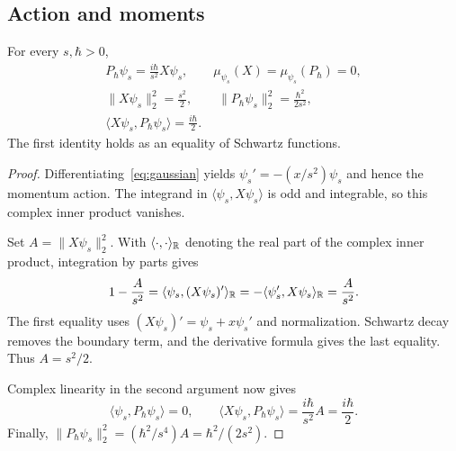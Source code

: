 \subsection{Action and moments}
\begin{theorem}\label{thm:moments}
For every $s,\hbar>0$,
\begin{gather}
 P_\hbar\psi_s=\frac{i\hbar}{s^2}X\psi_s,
 \qquad \mu_{\psi_s}(X)=\mu_{\psi_s}(P_\hbar)=0,\label{eq:action}\\
 \|X\psi_s\|_2^2=\frac{s^2}{2},\qquad
 \|P_\hbar\psi_s\|_2^2=\frac{\hbar^2}{2s^2},\label{eq:seconds}\\
 \langle X\psi_s,P_\hbar\psi_s\rangle=\frac{i\hbar}{2}.
 \label{eq:cross}
\end{gather}
The first identity holds as an equality of Schwartz functions.
\end{theorem}
\begin{proof}
Differentiating~\eqref{eq:gaussian} yields $\psi_s'=-(x/s^2)\psi_s$ and hence
the momentum action. The integrand in
$\langle \psi_s,X\psi_s\rangle$ is odd and integrable, so this complex
inner product vanishes.

Set $A=\|X\psi_s\|_2^2$. With $\langle\cdot,\cdot\rangle_\mathbb R$
denoting the real part of the complex inner product, integration by parts gives
\begin{equation}\label{eq:ibp}
 1-\frac{A}{s^2}
 =\langle \psi_s,(X\psi_s)'\rangle_\mathbb R
 =-\langle \psi_s',X\psi_s\rangle_\mathbb R
 =\frac{A}{s^2}.
\end{equation}
The first equality uses $(X\psi_s)'=\psi_s+x\psi_s'$ and normalization.
Schwartz decay removes the boundary term, and the derivative formula gives
the last equality. Thus $A=s^2/2$.

Complex linearity in the second argument now gives
\[
 \langle \psi_s,P_\hbar\psi_s\rangle=0,\qquad
 \langle X\psi_s,P_\hbar\psi_s\rangle
 =\frac{i\hbar}{s^2}A=\frac{i\hbar}{2}.
\]
Finally, $\|P_\hbar\psi_s\|_2^2=(\hbar^2/s^4)A=\hbar^2/(2s^2)$.
\end{proof}

